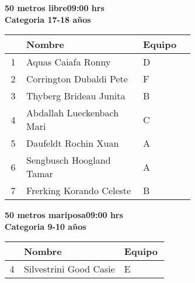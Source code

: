 \begin{minipage}{0.95\linewidth}\vspace{0.5cm} 
\begin{flushleft}
\textbf{
\hspace{-0.15cm}50 metros libre\hspace{1.5cm}09:00 hrs \\Categoria 17-18 años}\vspace{-0.2cm} 
\end{flushleft}
\begin{tabular}{cp{0.63\linewidth}l}
\hline
& \textbf{Nombre} & \textbf{Equipo} \\ \hline
1 & Aquas Caiafa Ronny & D \\ 
2 & Corrington Dubaldi Pete & F \\ 
3 & Thyberg Brideau Junita & B \\ 
4 & Abdallah Lueckenbach Mari & C \\ 
5 & Daufeldt Rochin Xuan & A \\ 
6 & Sengbusch Hoogland Tamar & A \\ 
7 & Frerking Korando Celeste & B \\ 
\end{tabular}
\end{minipage}
\begin{minipage}{0.95\linewidth}\vspace{0.5cm} 
\begin{flushleft}
\textbf{
\hspace{-0.15cm}50 metros mariposa\hspace{1.5cm}09:00 hrs \\Categoria 9-10 años}\vspace{-0.2cm} 
\end{flushleft}
\begin{tabular}{cp{0.63\linewidth}l}
\hline
& \textbf{Nombre} & \textbf{Equipo} \\ \hline
4 & Silvestrini Good Casie & E \\ 
\end{tabular}
\end{minipage}
